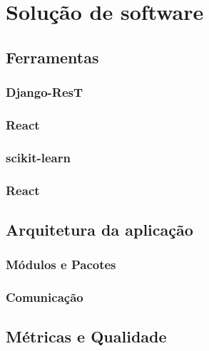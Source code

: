 \chapter*[Solução de software]{Solução de software}
\section{Ferramentas}
\subsection{Django-ResT}
\subsection{React}
\subsection{scikit-learn}
\subsection{React}

\section{Arquitetura da aplicação}
\subsection{Módulos e Pacotes}
\subsection{Comunicação}

\section{Métricas e Qualidade}
